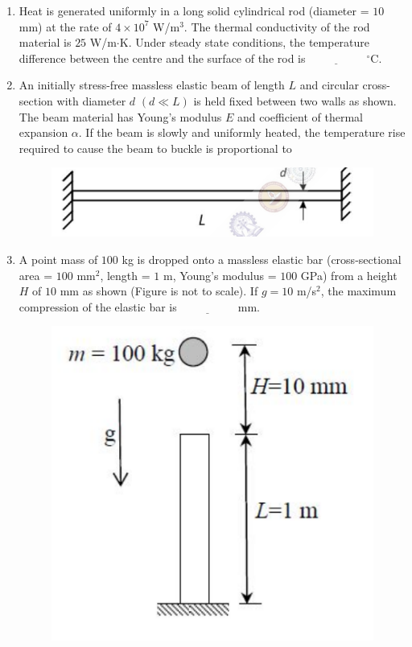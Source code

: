 \documentclass[journal]{IEEEtran}
\begin{document}
\begin{enumerate}[leftmargin=0pt]
    \item Heat is generated uniformly in a long solid cylindrical rod (diameter = $10$ mm) at the rate of $4 \times 10^7$ W/m$^3$. The thermal conductivity of the rod material is $25$ W/m$\cdot$K. Under steady state conditions, the temperature difference between the centre and the surface of the rod is $\underline{\hspace{2cm}}$ $^\circ$C.

    \item An initially stress-free massless elastic beam of length $L$ and circular cross-section with diameter $d$ $(d \ll L)$ is held fixed between two walls as shown. The beam material has Young's modulus $E$ and coefficient of thermal expansion $\alpha$. If the beam is slowly and uniformly heated, the temperature rise required to cause the beam to buckle is proportional to
    \begin{figure}[h]
    \centering
    \includegraphics[width=0.5\columnwidth]{Figs/image (25).png}
    \caption*{}
    \label{fig:39}
    \end{figure}
    \newpage
    \begin{enumerate}
    \end{enumerate}

    \item A point mass of $100$ kg is dropped onto a massless elastic bar (cross-sectional area = $100$ mm$^2$, length = $1$ m, Young's modulus = $100$ GPa) from a height $H$ of $10$ mm as shown (Figure is not to scale). If $g = 10$ m/s$^2$, the maximum compression of the elastic bar is $\underline{\hspace{2cm}}$ mm.
   \begin{figure}[h]
    \centering
    \includegraphics[width=0.5\columnwidth]{Figs/image (26).png}
    \caption*{}
    \label{fig:40}
    \end{figure} 


\end{enumerate}
\end{document}
